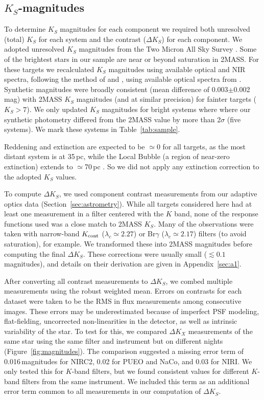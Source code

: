 \documentclass[twocolumn]{aastex62}
\begin{document}
\subsection{$K_S$-magnitudes} \label{sec:mags}

To determine $K_S$ magnitudes for each component we required both unresolved (total) $K_S$ for each system and the contrast ($\Delta K_S$) for each component. We adopted unresolved $K_S$ magnitudes from the Two Micron All Sky Survey \citep[2MASS,][]{Skrutskie2006}. Some of the brightest stars in our sample are near or beyond saturation in 2MASS. For these targets we recalculated $K_S$ magnitudes using available optical and NIR spectra, following the method of \citet{Mann2015a} and \citet{Mann2015b}, using available optical spectra from \citet{Gaidos2014}. Synthetic magnitudes were broadly consistent (mean difference of 0.003$\pm$0.002\,mag) with 2MASS $K_S$ magnitudes (and at similar precision) for fainter targets ($K_S>7$). We only updated $K_S$ magnitudes for bright systems where where our synthetic photometry differed from the 2MASS value by more than 2$\sigma$ (five systems). We mark these systems in Table~\ref{tab:sample}. 

Reddening and extinction are expected to be $\simeq$0 for all targets, as the most distant system is at 35\,pc, while the Local Bubble (a region of near-zero extinction) extends to $\simeq$70\,pc \citep{2009MNRAS.397.1286A}. So we did not apply any extinction correction to the adopted $K_S$ values.

To compute $\Delta K_S$, we used component contrast measurements from our adaptive optics data (Section~\ref{sec:astrometry}). While all targets considered here had at least one measurement in a filter centered with the $K$ band, none of the response functions used was a close match to 2MASS $K_S$. Many of the observations were taken with narrow-band $K_{\rm{cont}}$ ($\lambda_c\simeq2.27$\um) or Br$\gamma$ ($\lambda_c\simeq2.17$\um) filters (to avoid saturation), for example. We transformed these into 2MASS magnitudes before computing the final $\Delta K_S$. These corrections were usually small ($\lesssim0.1$ magnitudes), and details on their derivation are given in Appendix~\ref{sec:a1}.

After converting all contrast measurements to $\Delta K_S$, we combed multiple measurements using the robust weighted mean. Errors on contrasts for each dataset were taken to be the RMS in flux measurements among consecutive images. These errors may be underestimated because of imperfect PSF modeling, flat-fielding, uncorrected non-linearities in the detector, as well as intrinsic variability of the star. To test for this, we compared $\Delta K_X$ measurements of the same star using the same filter and instrument but on different nights (Figure~\ref{fig:magnitudes}). The comparison suggested a missing error term of 0.016\,magnitudes for NIRC2, 0.02 for PUEO and NaCo, and 0.03 for NIRI. We only tested this for $K$-band filters, but we found consistent values for different $K$-band filters from the same instrument. We included this term as an additional error term common to all measurements in our computation of $\Delta K_S$.
\end{document}
